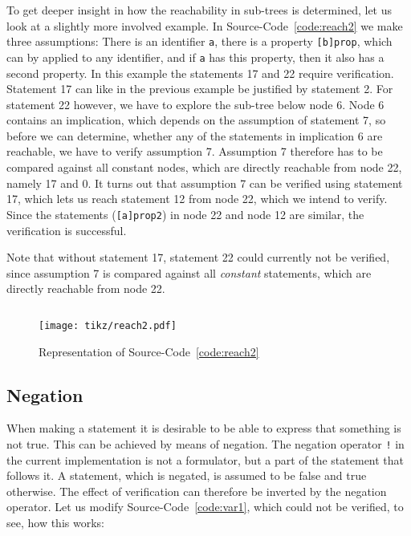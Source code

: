 \documentclass[british]{article}
\newcommand\prv{bc}
\newcommand\m[1]{\texttt{#1}}
\newenvironment{code}{\captionsetup{type=listing}}{}
\newcommand\scref[1]{Source-Code~\ref{code:#1}}
\begin{document}
To get deeper insight in how the reachability in sub-trees is determined, let us look at a slightly more involved example.
In \scref{reach2} we make three assumptions: There is an identifier \m{a}, there is a property \m{[b]prop}, which can by applied to any identifier, and if \m{a} has this property, then it also has a second property. In this example the statements 17 and 22 require verification. Statement 17 can like in the previous example be justified by statement 2. For statement 22 however, we have to explore the sub-tree below node 6. Node 6 contains an implication, which depends on the assumption of statement 7, so before we can determine, whether any of the statements in implication 6 are reachable, we have to verify assumption 7. Assumption 7 therefore has to be compared against all constant nodes, which are directly reachable from node 22, namely 17 and 0. It turns out that assumption 7 can be verified using statement 17, which lets us reach statement 12 from node 22, which we intend to verify. Since the statements (\m{[a]prop2}) in node 22 and node 12 are similar, the verification is successful.

Note that without statement 17, statement 22 could currently not be verified, since assumption 7 is compared against all \emph{constant} statements, which are directly reachable from node 22.
\pagebreak{}

\begin{code}
\label{code:reach2}
\inputminted[linenos]{\prv}{examples/reach2.prove}
\end{code}

\begin{figure}[!h]
\caption{Representation of \scref{reach2}}\label{fig:reach2}
\centering
\texttt{[image: tikz/reach2.pdf]}
\end{figure}

\pagebreak{}

\subsection{Negation}
When making a statement it is desirable to be able to express that something is not true. This can be achieved by means of negation. The negation operator \m{!} in the current implementation is not a formulator, but a part of the statement that follows it. A statement, which is negated, is assumed to be false and true otherwise. The effect of verification can therefore be inverted by the negation operator.
Let us modify \scref{var1}, which could not be verified, to see, how this works:
\begin{code}
\label{code:neg1}
\inputminted[linenos]{\prv}{examples/neg1.prove}
\end{code}
\end{document}
